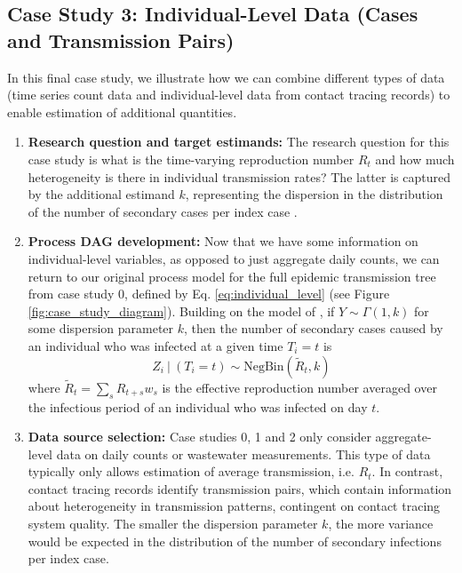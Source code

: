 \documentclass{article}
\begin{document}
\subsection{Case Study 3: Individual-Level Data (Cases and Transmission Pairs)}

In this final case study, we illustrate how we can combine different types of data (time series count data and individual-level data from contact tracing records) to enable estimation of additional quantities. 

\begin{enumerate}
   \item \textbf{Research question and target estimands:} The research question for this case study is what is the time-varying reproduction number $R_t$ and how much heterogeneity is there in individual transmission rates? The latter is captured by the additional estimand $k$, representing the dispersion in the distribution of the number of secondary cases per index case \citep{lloyd2005superspreading}. 
   
    \item \textbf{Process DAG development:} Now that we have some information on individual-level variables, as opposed to just aggregate daily counts, we can return to our original process model for the full epidemic transmission tree from case study 0, defined by Eq. \eqref{eq:individual_level} (see Figure \ref{fig:case_study_diagram}). 
    Building on the model of \citet{lloyd2005superspreading}, if $Y\sim \Gamma(1,k)$ for some dispersion parameter $k$, then the number of secondary cases caused by an individual who was infected at a given time $T_i=t$ is
     \begin{equation} \label{eq:offspring_dist}
        Z_i \ | \ (T_i=t) \sim \mathrm{NegBin}\left( \tilde{R}_{t}, k\right)
    \end{equation}   
    where $\tilde{R}_t= \sum_s R_{t+s} w_s$ is the effective reproduction number averaged over the infectious period of an individual who was infected on day $t$.
   
    \item \textbf{Data source selection:} Case studies 0, 1 and 2 only consider aggregate-level data on daily counts or wastewater measurements. This type of data typically only allows estimation of average transmission, i.e. $R_t$. In contrast, contact tracing records identify transmission pairs, which contain information about heterogeneity in transmission patterns, contingent on contact tracing system quality. The smaller the dispersion parameter $k$, the more variance would be expected in the distribution of the number of secondary infections per index case.
    

\end{enumerate}
\end{document}
